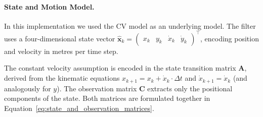     \paragraph{State and Motion Model.}
    In this implementation we used the \ac{CV} model as an underlying model. The filter uses a four-dimensional state vector
   $\hat{\mathbf{x}}_k = \begin{pmatrix} x_k & y_k & \dot{x}_k & \dot{y}_k \end{pmatrix}^\top$, encoding position and velocity in metres per time step. 

The constant velocity assumption is encoded in the state transition matrix $\mathbf{A}$, derived from the kinematic equations $x_{k+1} = x_k + \dot{x}_k \cdot \Delta t$ and $\dot{x}_{k+1} = \dot{x}_k$ (and analogously for $y$). The observation matrix $\mathbf{C}$ extracts only the positional components of the state. Both matrices are formulated together in Equation~\ref{eq:state_and_observation_matrices}.
    

